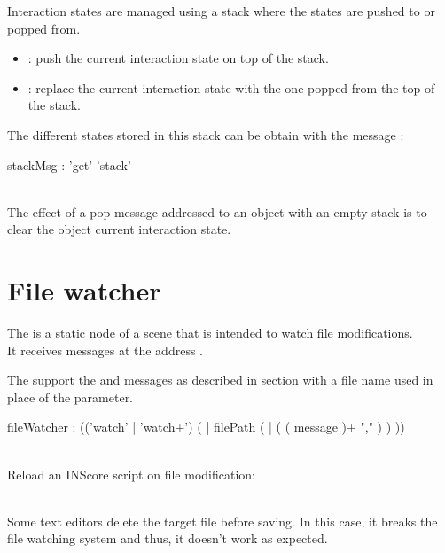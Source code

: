 \documentclass[a4paper,twoside]{report}
\newcommand{\sublevel}[1]	{\section{#1}}
\begin{document}
Interaction states are managed using a stack where the states are pushed to or popped from.
\begin{itemize}
\item {}: push the current interaction state on top of the stack.
\item {}: replace the current interaction state with the one popped from the top of the stack.
\end{itemize}

The different states stored in this stack can be obtain with the message :

\begin{rail} 
stackMsg : 'get' 'stack'
\end{rail}

\note{} \\
The effect of a pop message addressed to an object with an empty stack is to clear the object current interaction state.


\sublevel{File watcher}
\label{filewatch}

The  is a static node of a scene that is intended to watch file modifications. \\
It receives messages at the address .

The  support the  and  messages as described in section  with a file name used in place of the  parameter.


\begin{rail}
fileWatcher : (('watch' | 'watch+')  ( | filePath  ( |  ( ( message  )+ "," ) )  )) 
\end{rail}

\example \\
Reload an INScore script on file modification:

\note{}\\
Some text editors delete the target file before saving. In this case, it breaks the file watching system and thus, it doesn't work as expected.



\end{document}
